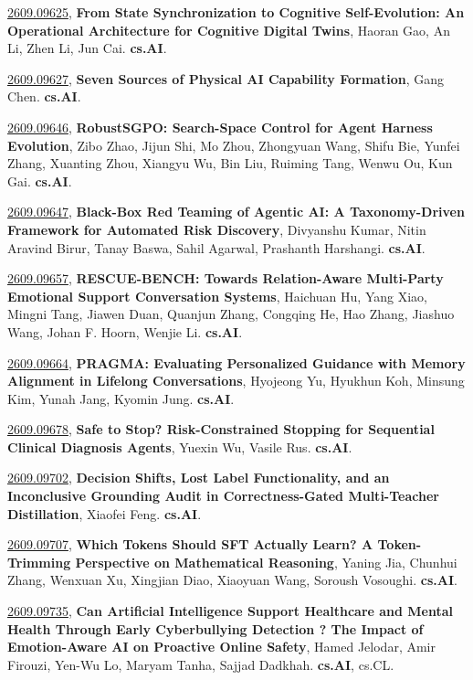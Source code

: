 \documentclass[9pt, a4paper]{article}
\theoremstyle{plain}
\theoremstyle{definition}
\theoremstyle{remark}
\newcommand{\arxivwithtarget}[3]{\hypertarget{#1}{}\href{https://arxiv.org/abs/#1}{#1}, \textbf{\textcolor{arxivblue}{#2}}, #3. }
\begin{document}
\arxivwithtarget{2609.09625}{From State Synchronization to Cognitive Self-Evolution: An Operational Architecture for Cognitive Digital Twins}{Haoran Gao, An Li, Zhen Li, Jun Cai}\textbf{cs.AI}.



\arxivwithtarget{2609.09627}{Seven Sources of Physical AI Capability Formation}{Gang Chen}\textbf{cs.AI}.



\arxivwithtarget{2609.09646}{RobustSGPO: Search-Space Control for Agent Harness Evolution}{Zibo Zhao, Jijun Shi, Mo Zhou, Zhongyuan Wang, Shifu Bie, Yunfei Zhang, Xuanting Zhou, Xiangyu Wu, Bin Liu, Ruiming Tang, Wenwu Ou, Kun Gai}\textbf{cs.AI}.



\arxivwithtarget{2609.09647}{Black-Box Red Teaming of Agentic AI: A Taxonomy-Driven Framework for Automated Risk Discovery}{Divyanshu Kumar, Nitin Aravind Birur, Tanay Baswa, Sahil Agarwal, Prashanth Harshangi}\textbf{cs.AI}.



\arxivwithtarget{2609.09657}{RESCUE-BENCH: Towards Relation-Aware Multi-Party Emotional Support Conversation Systems}{Haichuan Hu, Yang Xiao, Mingni Tang, Jiawen Duan, Quanjun Zhang, Congqing He, Hao Zhang, Jiashuo Wang, Johan F. Hoorn, Wenjie Li}\textbf{cs.AI}.



\arxivwithtarget{2609.09664}{PRAGMA: Evaluating Personalized Guidance with Memory Alignment in Lifelong Conversations}{Hyojeong Yu, Hyukhun Koh, Minsung Kim, Yunah Jang, Kyomin Jung}\textbf{cs.AI}.



\arxivwithtarget{2609.09678}{Safe to Stop? Risk-Constrained Stopping for Sequential Clinical Diagnosis Agents}{Yuexin Wu, Vasile Rus}\textbf{cs.AI}.



\arxivwithtarget{2609.09702}{Decision Shifts, Lost Label Functionality, and an Inconclusive Grounding Audit in Correctness-Gated Multi-Teacher Distillation}{Xiaofei Feng}\textbf{cs.AI}.



\arxivwithtarget{2609.09707}{Which Tokens Should SFT Actually Learn? A Token-Trimming Perspective on Mathematical Reasoning}{Yaning Jia, Chunhui Zhang, Wenxuan Xu, Xingjian Diao, Xiaoyuan Wang, Soroush Vosoughi}\textbf{cs.AI}.



\arxivwithtarget{2609.09735}{Can Artificial Intelligence Support Healthcare and Mental Health Through Early Cyberbullying Detection ? The Impact of Emotion-Aware AI on Proactive Online Safety}{Hamed Jelodar, Amir Firouzi, Yen-Wu Lo, Maryam Tanha, Sajjad Dadkhah}\textbf{cs.AI}, cs.CL.
\end{document}
